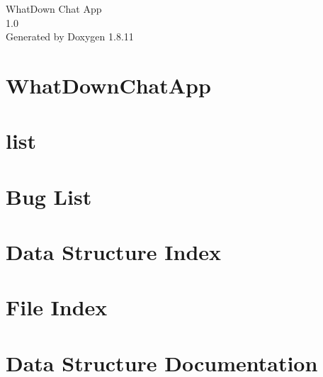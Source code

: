 \documentclass[twoside]{book}
\newcommand{\+}{\discretionary{\mbox{\scriptsize$\hookleftarrow$}}{}{}}
\newcommand{\clearemptydoublepage}{%
  \newpage{\pagestyle{empty}\cleardoublepage}%
}
\begin{document}
\hypersetup{pageanchor=false,
             bookmarksnumbered=true,
             pdfencoding=unicode
            }
\begin{titlepage}
\vspace*{7cm}
\begin{center}%
{\Large What\+Down Chat App \\[1ex]\large 1.\+0 }\\
\vspace*{1cm}
{\large Generated by Doxygen 1.8.11}\\
\end{center}
\end{titlepage}
\clearemptydoublepage
\tableofcontents
\clearemptydoublepage
{}
\hypersetup{pageanchor=true}

\chapter{What\+Down\+Chat\+App}
\label{md_README}
\hypertarget{md_README}{}

\chapter{list}
\label{md_comm_tcp_list_Readme}
\hypertarget{md_comm_tcp_list_Readme}{}

\chapter{Bug List}
\label{bug}
\hypertarget{bug}{}

\chapter{Data Structure Index}

\chapter{File Index}

\chapter{Data Structure Documentation}
























\end{document}
